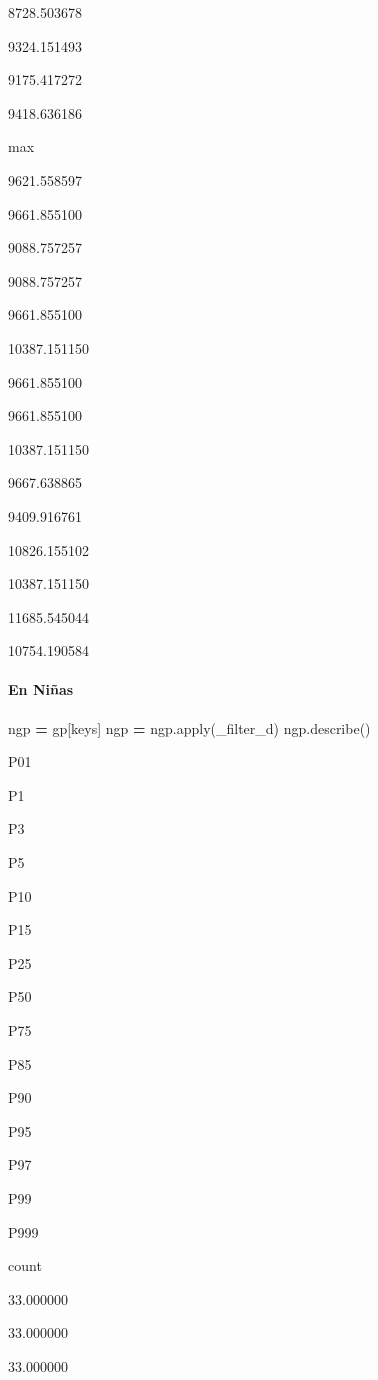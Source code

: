 \documentclass[
]{article}
\newenvironment{Shaded}{\begin{snugshade}}{\end{snugshade}}
\newcommand{\BuiltInTok}[1]{#1}
\newcommand{\NormalTok}[1]{#1}
\newcommand{\OperatorTok}[1]{\textcolor[rgb]{0.81,0.36,0.00}{\textbf{#1}}}
\begin{document}
8728.503678

9324.151493

9175.417272

9418.636186

max

9621.558597

9661.855100

9088.757257

9088.757257

9661.855100

10387.151150

9661.855100

9661.855100

10387.151150

9667.638865

9409.916761

10826.155102

10387.151150

11685.545044

10754.190584

\hypertarget{en-niuxf1as}{%
\paragraph{En Niñas}\label{en-niuxf1as}}

\begin{Shaded}
\begin{Highlighting}[]
\NormalTok{ngp }\OperatorTok{=}\NormalTok{ gp[keys]}
\NormalTok{ngp }\OperatorTok{=}\NormalTok{ ngp.}\BuiltInTok{apply}\NormalTok{(\_filter\_d)}
\NormalTok{ngp.describe()}
\end{Highlighting}
\end{Shaded}

P01

P1

P3

P5

P10

P15

P25

P50

P75

P85

P90

P95

P97

P99

P999

count

33.000000

33.000000

33.000000
\end{document}
